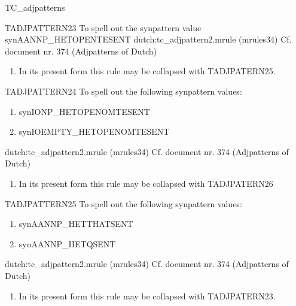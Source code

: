 \begin{mruleclass}{TC\_adjpatterns}
\begin{members}
\begin{member}
\end{member}
\begin{member}
 TADJPATTERN23
 To spell out the  synpattern value synAANNP\_HETOPENTESENT
\file dutch:tc\_adjpattern2.mrule (mrules34)
\semantics \nosemantics
\example Cf. document nr. 374 (Adjpatterns of Dutch)
\remarks\mbox{}
\begin{enumerate}
\item In its present form this rule may be collapsed with TADJPATERN25.

\end{enumerate}

\end{member}
\begin{member}
 TADJPATTERN24
 To spell out the following synpattern values:
\begin{enumerate}
  \item synIONP\_HETOPENOMTESENT 
  \item synIOEMPTY\_HETOPENOMTESENT  
\end{enumerate}
\file dutch:tc\_adjpattern2.mrule (mrules34)
\semantics \nosemantics
\example Cf. document nr. 374 (Adjpatterns of Dutch)
\remarks\mbox{}
\begin{enumerate}
\item In its present form this rule may be collapsed with TADJPATERN26

\end{enumerate}

\end{member}

\begin{member}
 TADJPATTERN25
 To spell out the following synpattern values:
\begin{enumerate}
  \item synAANNP\_HETTHATSENT
  \item synAANNP\_HETQSENT 
\end{enumerate}
\file dutch:tc\_adjpattern2.mrule (mrules34)
\semantics \nosemantics
\example Cf. document nr. 374 (Adjpatterns of Dutch)
\remarks\mbox{}
\begin{enumerate}
\item In its present form this rule may be collapsed with TADJPATERN23.

\end{enumerate}


\end{member}
\end{members}
\end{mruleclass}
